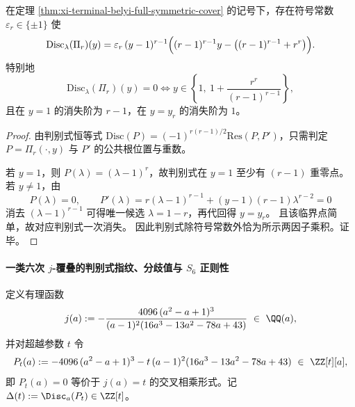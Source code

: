 \begin{theorem}[判别式的闭式分解与双有限分歧点]\label{thm:xi-terminal-belyi-discriminant-closed-form}
在定理 \ref{thm:xi-terminal-belyi-full-symmetric-cover} 的记号下，存在符号常数 \(\varepsilon_r\in\{\pm1\}\) 使
\[
\mathrm{Disc}_{\lambda}(\Pi_r)(y)
=\varepsilon_r\,(y-1)^{r-1}
\Bigl((r-1)^{r-1}y-\bigl((r-1)^{r-1}+r^r\bigr)\Bigr).
\]
特别地
\[
\mathrm{Disc}_{\lambda}(\Pi_r)(y)=0
\iff
y\in\left\{1,\ 1+\frac{r^r}{(r-1)^{r-1}}\right\},
\]
且在 \(y=1\) 的消失阶为 \(r-1\)，在 \(y=y_r\) 的消失阶为 \(1\)。
\end{theorem}
\begin{proof}
由判别式恒等式
\(
\mathrm{Disc}(P)=(-1)^{r(r-1)/2}\mathrm{Res}(P,P')
\)，只需判定 \(P=\Pi_r(\cdot,y)\) 与 \(P'\) 的公共根位置与重数。

若 \(y=1\)，则 \(P(\lambda)=(\lambda-1)^r\)，故判别式在 \(y=1\) 至少有 \((r-1)\) 重零点。
若 \(y\neq1\)，由
\[
P(\lambda)=0,\qquad
P'(\lambda)=r(\lambda-1)^{r-1}+(y-1)(r-1)\lambda^{r-2}=0
\]
消去 \((\lambda-1)^{r-1}\) 可得唯一候选 \(\lambda=1-r\)，再代回得 \(y=y_r\)。
且该临界点简单，故对应判别式一次消失。
因此判别式除符号常数外恰为所示两因子乘积。证毕。
\end{proof}




\paragraph{一类六次 \texorpdfstring{$j$}{j}-覆叠的判别式指纹、分歧值与 \texorpdfstring{$S_6$}{S6} 正则性}
定义有理函数
\[
j(a):=-\frac{4096\,(a^2-a+1)^3}{(a-1)^2(16a^3-13a^2-78a+43)}\ \in\ \QQ(a),
\]
并对超越参数 \(t\) 令
\[
P_t(a):=-4096\,(a^2-a+1)^3-t\,(a-1)^2(16a^3-13a^2-78a+43)\ \in\ \ZZ[t][a],
\]
即 \(P_t(a)=0\) 等价于 \(j(a)=t\) 的交叉相乘形式。记
\(
\Delta(t):=\Disc_a(P_t)\in\ZZ[t]
\)。

